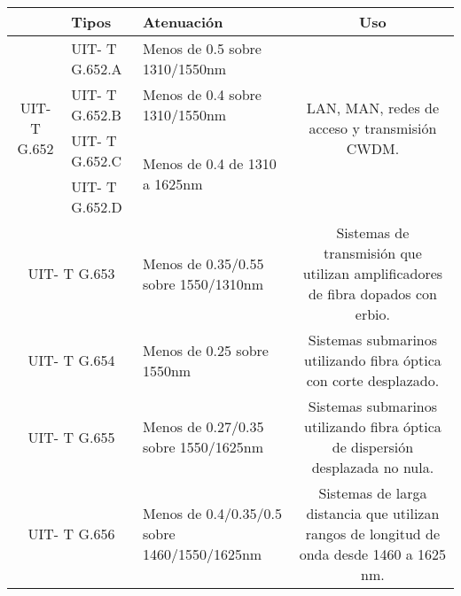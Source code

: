 %
%
%

 




\begin{table}[H]
  \tiny
  \centering
    \begin{tabular}{|c|p{6.78em}|p{22.945em}|c|}
    \hline
    \rowcolor[HTML]{C5D9F1} \multicolumn{1}{|p{9.055em}|}{\textbf{Recomendación}} & \textbf{Tipos} & \textbf{Atenuación} & \multicolumn{1}{p{41.335em}|}{\textbf{Uso}} \bigstrut\\
    \hline
    \multicolumn{1}{|c|}{\multirow{4}[8]{*}{UIT- T G.652}} & UIT- T G.652.A & Menos de 0.5 sobre 1310/1550nm & \multicolumn{1}{c|}{\multirow{4}[8]{*}{LAN, MAN, redes de acceso y transmisión CWDM.}} \bigstrut\\
\cline{2-3}          & UIT- T G.652.B & Menos de 0.4 sobre 1310/1550nm &  \bigstrut\\
\cline{2-3}          & UIT- T G.652.C & \multirow{2}[4]{*}{Menos de 0.4 de 1310 a 1625nm} &  \bigstrut\\
\cline{2-2}          & UIT- T G.652.D & \multicolumn{1}{c|}{} &  \bigstrut\\
    \hline
    \multicolumn{2}{|p{17.835em}|}{UIT- T G.653} & Menos de 0.35/0.55 sobre 1550/1310nm & \multicolumn{1}{p{41.335em}|}{Sistemas de transmisión que utilizan amplificadores de fibra dopados con erbio.} \bigstrut\\
    \hline
    \multicolumn{2}{|p{17.835em}|}{UIT- T G.654} & Menos de 0.25 sobre 1550nm & \multicolumn{1}{p{41.335em}|}{Sistemas submarinos utilizando fibra óptica con corte desplazado.} \bigstrut\\
    \hline
    \multicolumn{2}{|p{17.835em}|}{UIT- T G.655} & Menos de 0.27/0.35 sobre 1550/1625nm & \multicolumn{1}{p{41.335em}|}{Sistemas submarinos utilizando fibra óptica de dispersión desplazada no nula.} \bigstrut\\
    \hline
    \multicolumn{2}{|p{17.835em}|}{UIT- T G.656} & Menos de 0.4/0.35/0.5 sobre 1460/1550/1625nm & \multicolumn{1}{p{41.335em}|}{Sistemas de larga distancia que utilizan rangos de longitud de onda desde 1460 a 1625 nm.\newline{}} \bigstrut\\

\end{tabular}
\end{table}
